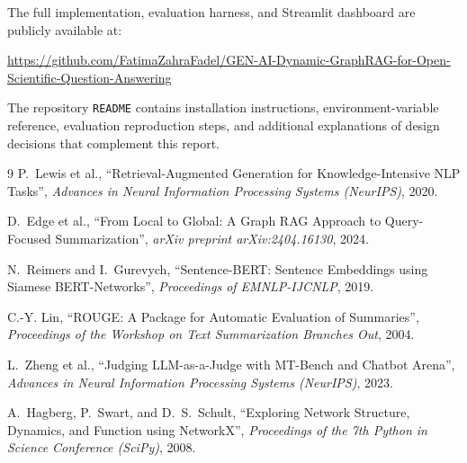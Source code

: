 \documentclass[11pt,a4paper]{article}
\begin{document}
The full implementation, evaluation harness, and Streamlit dashboard are
publicly available at:

\begin{center}
\url{https://github.com/FatimaZahraFadel/GEN-AI-Dynamic-GraphRAG-for-Open-Scientific-Question-Answering}
\end{center}

The repository \texttt{README} contains installation instructions,
environment-variable reference, evaluation reproduction steps, and
additional explanations of design decisions that complement this report.

\begin{thebibliography}{9}
P.~Lewis et al., ``Retrieval-Augmented Generation for Knowledge-Intensive NLP Tasks'',
\emph{Advances in Neural Information Processing Systems (NeurIPS)}, 2020.

D.~Edge et al., ``From Local to Global: A Graph RAG Approach to Query-Focused Summarization'',
\emph{arXiv preprint arXiv:2404.16130}, 2024.

N.~Reimers and I.~Gurevych, ``Sentence-BERT: Sentence Embeddings using Siamese
BERT-Networks'', \emph{Proceedings of EMNLP-IJCNLP}, 2019.

C.-Y. Lin, ``ROUGE: A Package for Automatic Evaluation of Summaries'',
\emph{Proceedings of the Workshop on Text Summarization Branches Out}, 2004.

L.~Zheng et al., ``Judging LLM-as-a-Judge with MT-Bench and Chatbot Arena'',
\emph{Advances in Neural Information Processing Systems (NeurIPS)}, 2023.

A.~Hagberg, P.~Swart, and D.~S.~Schult, ``Exploring Network Structure, Dynamics,
and Function using NetworkX'', \emph{Proceedings of the 7th Python in Science
Conference (SciPy)}, 2008.
\end{thebibliography}
\end{document}
